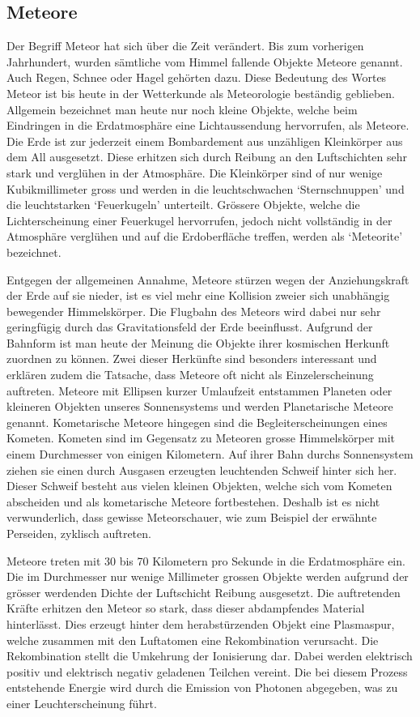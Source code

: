 \begin{refsection}
\section{Meteore}

Der Begriff Meteor hat sich über die Zeit verändert. 
Bis zum vorherigen Jahrhundert, wurden sämtliche vom Himmel fallende Objekte Meteore genannt. 
Auch Regen, Schnee oder Hagel gehörten dazu. 
Diese Bedeutung des Wortes Meteor ist bis heute in der Wetterkunde als Meteorologie beständig geblieben.
Allgemein bezeichnet man heute nur noch kleine Objekte, welche beim Eindringen in die Erdatmosphäre eine Lichtaussendung hervorrufen, als Meteore.  
Die Erde ist zur jederzeit einem Bombardement aus unzähligen Kleinkörper aus dem All ausgesetzt. 
Diese erhitzen sich durch Reibung an den Luftschichten sehr stark und verglühen in der Atmosphäre. 
Die Kleinkörper sind of nur wenige Kubikmillimeter gross und werden in die leuchtschwachen `Sternschnuppen' und die leuchtstarken `Feuerkugeln' unterteilt.
Grössere Objekte, welche die Lichterscheinung einer Feuerkugel hervorrufen, jedoch nicht vollständig in der Atmosphäre verglühen und auf die Erdoberfläche treffen, werden als `Meteorite' bezeichnet.

Entgegen der allgemeinen Annahme, Meteore stürzen wegen der Anziehungskraft der Erde auf sie nieder, ist es viel mehr eine Kollision zweier sich unabhängig bewegender Himmelskörper. 
Die Flugbahn des Meteors wird dabei nur sehr geringfügig durch das Gravitationsfeld der Erde beeinflusst.
Aufgrund der Bahnform ist man heute der Meinung die Objekte ihrer kosmischen Herkunft zuordnen zu können. 
Zwei dieser Herkünfte sind besonders interessant und erklären zudem die Tatsache, dass Meteore oft nicht als Einzelerscheinung auftreten. 
Meteore mit Ellipsen kurzer Umlaufzeit entstammen Planeten oder kleineren Objekten unseres Sonnensystems und werden Planetarische Meteore genannt.
Kometarische Meteore hingegen sind die Begleiterscheinungen eines Kometen. 
Kometen sind im Gegensatz zu Meteoren grosse Himmelskörper mit einem Durchmesser von einigen Kilometern.
Auf ihrer Bahn durchs Sonnensystem ziehen sie einen durch Ausgasen erzeugten leuchtenden Schweif hinter sich her.
Dieser Schweif besteht aus vielen kleinen Objekten, welche sich vom Kometen abscheiden und als kometarische Meteore fortbestehen.
Deshalb ist es nicht verwunderlich, dass gewisse Meteorschauer, wie zum Beispiel der erwähnte Perseiden, zyklisch auftreten.\cite{lexikon:meyer}

Meteore treten mit 30 bis 70 Kilometern pro Sekunde in die Erdatmosphäre ein. 
Die im Durchmesser nur wenige Millimeter grossen Objekte werden aufgrund der grösser werdenden Dichte der Luftschicht Reibung ausgesetzt.
Die auftretenden Kräfte erhitzen den Meteor so stark, dass dieser abdampfendes Material hinterlässt.
Dies erzeugt hinter dem herabstürzenden Objekt eine Plasmaspur, welche zusammen mit den Luftatomen eine Rekombination verursacht.
Die Rekombination stellt die Umkehrung der Ionisierung dar. 
Dabei werden elektrisch positiv und elektrisch negativ geladenen Teilchen vereint.
Die bei diesem Prozess entstehende Energie wird durch die Emission von Photonen abgegeben, was zu einer Leuchterscheinung führt.\cite{web:brodbeck}



\end{refsection}
